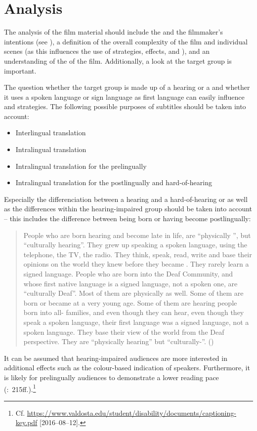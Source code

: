 \section{Analysis}\label{sec:5.1}

The analysis of the film material should include the  and the filmmaker’s intentions (see ), a definition of the overall complexity of the film and individual scenes (as this influences the use of  strategies, effects, and ), and an understanding of the  of the film. Additionally, a look at the target group is important.



The question whether the target group is made up of a hearing or a  and whether it uses a spoken language or sign language as first language can easily influence  and  strategies. The following possible purposes of subtitles should be taken into account:


\begin{itemize}
\item Interlingual translation
\item Intralingual translation
\item Intralingual translation for the prelingually 
\item Intralingual translation for the postlingually  and hard-of-hearing
\end{itemize}

Especially the differenciation between a hearing and a hard-of-hearing or  as well as the differences within the hearing-impaired group should be taken into account – this includes the difference between being born  or having become  postlingually:
\begin{quote}
People who are born hearing and become  late in life, are “physically ”, but “culturally hearing”. They grew up speaking a spoken language, using the telephone, the TV, the radio. They think, speak, read, write and base their opinions on the world they knew before they became . They rarely learn a signed language. People who are born into the Deaf Community, and whose first native language is a signed language, not a spoken one, are “culturally Deaf”. Most of them are physically  as well. Some of them are born  or became  at a very young age. Some of them are hearing people born into all- families, and even though they can hear, even though they speak a spoken language, their first language was a signed language, not a spoken language. They base their view of the world from the Deaf perspective. They are “physically hearing” but “culturally-”. (\citealt{sutten????})
\end{quote}
It can be assumed that hearing-impaired audiences are more interested in additional  effects such as the colour-based indication of speakers. Furthermore, it is likely for prelingually  audiences to demonstrate a lower reading pace (\citealt{Dyer2003}:~215ff.).\footnote{Cf. \url{https://www.valdosta.edu/student/disability/documents/captioning-key.pdf} [2016--08--12].}

